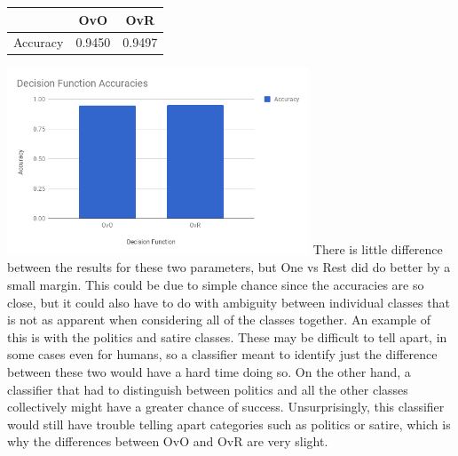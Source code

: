\documentclass{article}
\begin{document}
        \begin{center}
            \begin{tabular}{|c|c|c|}
                \hline
                            & OvO       & OvR\\
                \hline
                Accuracy    & 0.9450    & 0.9497\\
                \hline
            \end{tabular}
        \end{center}
        \includegraphics[width=9cm]{graphs/OvO_OvR}
        There is little difference between the results for these two parameters, but One vs Rest 
        did do better by a small margin. This could be due to simple chance since the accuracies 
        are so close, but it could also have to do with ambiguity between individual classes that 
        is not as apparent when considering all of the classes together. An example of this is 
        with the politics and satire classes. These may be difficult to tell apart, in some cases 
        even for humans, so a classifier meant to identify just the difference between these two 
        would have a hard time doing so. On the other hand, a classifier that had to distinguish 
        between politics and all the other classes collectively might have a greater chance of 
        success. Unsurprisingly, this classifier would still have trouble telling apart categories 
        such as politics or satire, which is why the differences between OvO and OvR are very 
        slight.
    
\end{document}
